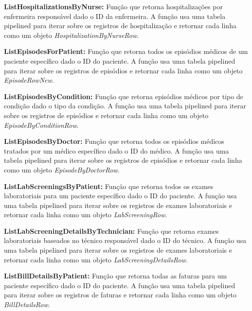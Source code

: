 \vspace{0.15cm}
\textbf{ListHospitalizationsByNurse:} Função que retorna hospitalizações por enfermeira responsável dado o ID da enfermeira. A função usa uma tabela pipelined para iterar sobre os registros de hospitalização e retornar cada linha como um objeto \textit{HospitalizationByNurseRow}.

\vspace{0.15cm}
\textbf{ListEpisodesForPatient:} Função que retorna todos os episódios médicos de um paciente específico dado o ID do paciente. A função usa uma tabela pipelined para iterar sobre os registros de episódios e retornar cada linha como um objeto \textit{EpisodeRowNew}.

\vspace{0.15cm}
\textbf{ListEpisodesByCondition:} Função que retorna episódios médicos por tipo de condição dado o tipo da condição. A função usa uma tabela pipelined para iterar sobre os registros de episódios e retornar cada linha como um objeto \textit{EpisodeByConditionRow}.

\vspace{0.15cm}
\textbf{ListEpisodesByDoctor:} Função que retorna todos os episódios médicos tratados por um médico específico dado o ID do médico. A função usa uma tabela pipelined para iterar sobre os registros de episódios e retornar cada linha como um objeto \textit{EpisodeByDoctorRow}.

\vspace{0.15cm}
\textbf{ListLabScreeningsByPatient:} Função que retorna todos os exames laboratoriais para um paciente específico dado o ID do paciente. A função usa uma tabela pipelined para iterar sobre os registros de exames laboratoriais e retornar cada linha como um objeto \textit{LabScreeningRow}.

\vspace{0.15cm}
\textbf{ListLabScreeningDetailsByTechnician:} Função que retorna exames laboratoriais baseados no técnico responsável dado o ID do técnico. A função usa uma tabela pipelined para iterar sobre os registros de exames laboratoriais e retornar cada linha como um objeto \textit{LabScreeningDetailsRow}.

\vspace{0.15cm}
\textbf{ListBillDetailsByPatient:} Função que retorna todas as faturas para um paciente específico dado o ID do paciente. A função usa uma tabela pipelined para iterar sobre os registros de faturas e retornar cada linha como um objeto \textit{BillDetailsRow}.

